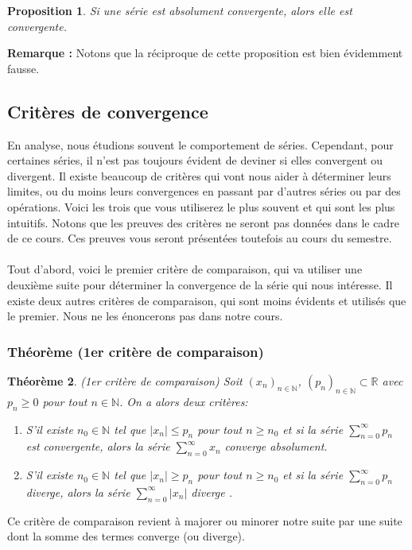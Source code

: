 \documentclass[a4paper, 12pt, french, twoside]{article}
\newtheorem{theorem}{Théorème}[section]
\newtheorem{proposition}[theorem]{Proposition}
\newcommand{\Nn}{{\mathbb{N}}}
\newcommand{\Rr}{{\mathbb{R}}}
\begin{document}
\begin{proposition}
    Si une série est absolument convergente, alors elle est convergente.
\end{proposition}
 
  \textbf{Remarque :} Notons que la réciproque de cette proposition est bien évidemment fausse. 

\subsection{Critères de convergence}

En analyse, nous étudions souvent le comportement de séries. Cependant, pour certaines séries, il n'est pas toujours évident de deviner si elles convergent ou divergent. Il existe beaucoup de critères qui vont nous aider à déterminer leurs limites, ou du moins leurs convergences en passant par d'autres séries ou par des opérations. Voici les trois que vous utiliserez le plus souvent et qui sont les plus intuitifs. Notons que les preuves des critères ne seront pas données dans le cadre de ce cours. Ces preuves vous seront présentées toutefois au cours du semestre. 
\\
\\Tout d'abord, voici le premier critère de comparaison, qui va utiliser une deuxième suite pour déterminer la convergence de la série qui nous intéresse. Il existe deux autres critères de comparaison, qui sont moins évidents et utilisés que le premier. Nous ne les énoncerons pas dans notre cours.

\subsubsection{Théorème (1er critère de comparaison)}
\begin{theorem}\label{comparaison}
    (1er critère de comparaison)
    Soit $(x_n)_{n\in\Nn}$, $(p_n)_{n\in\Nn}\subset\Rr$ avec $p_n\geq0$ pour tout $n\in\Nn$.
    On a alors deux critères:
    \begin{enumerate}
        \item S'il existe $n_0 \in\Nn$ tel que $|x_n|\leq p_n$ pour tout $n\geq n_0$ et si la série $\sum_{n=0}^\infty p_n$ est convergente, alors la série $\sum_{n=0}^\infty x_n$ converge absolument.
       \item S'il existe $n_0 \in\Nn$ tel que $|x_n|\geq p_n$ pour tout $n\geq n_0$ et si la série $\sum_{n=0}^\infty p_n$ diverge, alors la série $\sum_{n=0}^\infty |x_n|$ diverge .
    \end{enumerate}
\end{theorem}
Ce critère de comparaison revient à majorer ou minorer notre suite par une suite dont la somme des termes converge (ou diverge).\\
\end{document}
